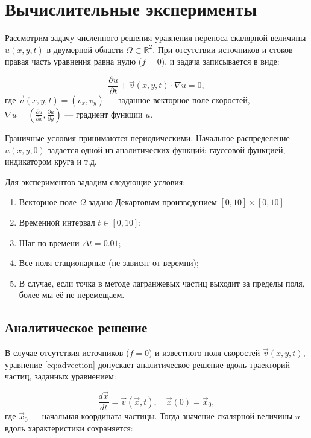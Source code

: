 \chapter{Вычислительные эксперименты}
Рассмотрим задачу численного решения уравнения переноса скалярной величины \( u(x, y, t) \) в двумерной области \(\Omega \subset \mathbb{R}^2\). При отсутствии источников и стоков правая часть уравнения равна нулю (\(f = 0\)), и задача записывается в виде:

\begin{equation}
	\frac{\partial u}{\partial t} + \vec{v}(x, y, t) \cdot \nabla u = 0,
	\label{eq:advection}
\end{equation}
где \( \vec{v}(x, y, t) = (v_x, v_y) \) — заданное векторное поле скоростей, \( \nabla u = \left( \frac{\partial u}{\partial x}, \frac{\partial u}{\partial y} \right) \) — градиент функции \( u \).

Граничные условия принимаются периодическими. Начальное распределение \( u(x, y, 0) \) задается одной из аналитических функций: гауссовой функцией, индикатором круга и т.д.

Для экспериментов зададим следующие условия:
\begin{enumerate}
	\item Векторное поле $\Omega$ задано Декартовым произведением $[0,10] \times [0,10]$
	\item Временной интервал $t\in [0, 10]$;
	\item Шаг по времени $\Delta t = 0.01$;
	\item Все поля стационарные (не зависят от веремни);
	\item В случае, если точка в методе лагранжевых частиц выходит за пределы поля, более мы её не перемещаем.
\end{enumerate}

\section{Аналитическое решение}

В случае отсутствия источников (\(f = 0\)) и известного поля скоростей \(\vec{v}(x,y,t)\), уравнение \eqref{eq:advection} допускает аналитическое решение вдоль траекторий частиц, заданных уравнением:

\begin{equation}
	\frac{d\vec{x}}{dt} = \vec{v}(\vec{x}, t), \quad \vec{x}(0) = \vec{x}_0,
	\label{eq:characteristics}
\end{equation}
где \(\vec{x}_0\) — начальная координата частицы. Тогда значение скалярной величины \(u\) вдоль характеристики сохраняется:

